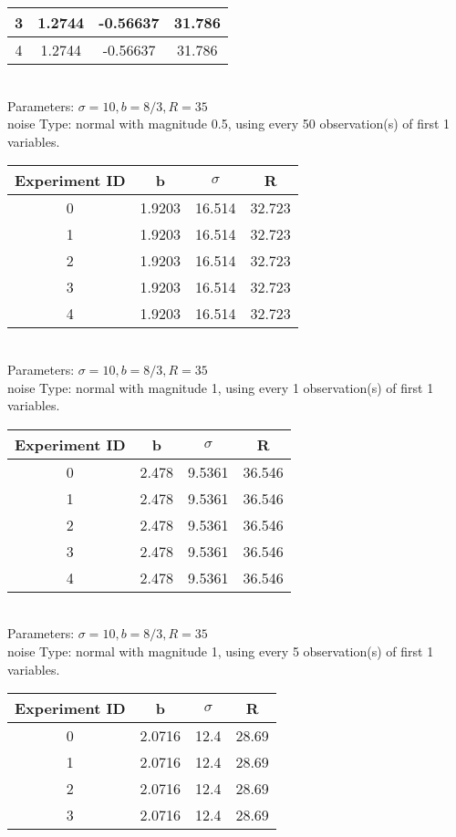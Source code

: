 \begin{multicols}{3}
\begin{tabular}{cccc}
 3 & 1.2744 & -0.56637 & 31.786\\ \hline 
 4 & 1.2744 & -0.56637 & 31.786\\ \hline 
 \end{tabular}\\
Parameters: $\sigma=10, b=8/3, R=35$\\
noise Type: normal with magnitude 0.5, using every 50 observation(s) of first 1 variables.\\
\begin{tabular}{cccc}
\hline Experiment ID & b & $\sigma$ & R \\ \hline 
0 & 1.9203 & 16.514 & 32.723\\ \hline 
 1 & 1.9203 & 16.514 & 32.723\\ \hline 
 2 & 1.9203 & 16.514 & 32.723\\ \hline 
 3 & 1.9203 & 16.514 & 32.723\\ \hline 
 4 & 1.9203 & 16.514 & 32.723\\ \hline 
 \end{tabular}\\
Parameters: $\sigma=10, b=8/3, R=35$\\
noise Type: normal with magnitude 1, using every 1 observation(s) of first 1 variables.\\
\begin{tabular}{cccc}
\hline Experiment ID & b & $\sigma$ & R \\ \hline 
0 & 2.478 & 9.5361 & 36.546\\ \hline 
 1 & 2.478 & 9.5361 & 36.546\\ \hline 
 2 & 2.478 & 9.5361 & 36.546\\ \hline 
 3 & 2.478 & 9.5361 & 36.546\\ \hline 
 4 & 2.478 & 9.5361 & 36.546\\ \hline 
 \end{tabular}\\
Parameters: $\sigma=10, b=8/3, R=35$\\
noise Type: normal with magnitude 1, using every 5 observation(s) of first 1 variables.\\
\begin{tabular}{cccc}
\hline Experiment ID & b & $\sigma$ & R \\ \hline 
0 & 2.0716 & 12.4 & 28.69\\ \hline 
 1 & 2.0716 & 12.4 & 28.69\\ \hline 
 2 & 2.0716 & 12.4 & 28.69\\ \hline 
 3 & 2.0716 & 12.4 & 28.69\\ \hline 

\end{tabular}
\end{multicols}
